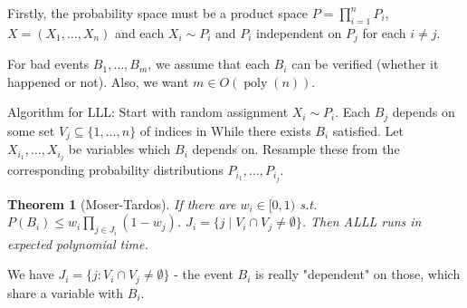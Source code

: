 \documentclass{article}
\theoremstyle{plain}
\newtheorem{thm}{Theorem}[section]
\theoremstyle{definition}
\newcommand{\poly}{\operatorname{poly}}
\begin{document}
Firstly, the probability space must be a product space $P=\prod_{i=1}^n P_i$, $X=(X_1,\ldots, X_n)$ and each $X_i\sim P_i$ and $P_i$ independent on $P_j$ for each $i\neq j$.

For bad events $B_1,\ldots, B_m$, we assume that each $B_i$ can be verified (whether it happened or not). Also, we want $m\in O(\poly(n))$.


Algorithm for LLL: Start with random assignment $X_i\sim P_i$. Each $B_j$ depends on some set $V_j\subseteq \{1,\ldots,n\}$ of indices in While there exists $B_i$ satisfied. Let $X_{i_1},\ldots,X_{i_j}$ be variables which $B_i$ depends on. Resample these from the corresponding probability distributions $P_{i_1},\ldots,P_{i_j}$.

\begin{thm}[Moser-Tardos]
	If there are $w_i\in[0,1)$ s.t. $P(B_i)\leq w_i\prod_{j\in J_i}(1-w_j)$. $J_i=\{j \mid V_i\cap V_j\neq \emptyset\}$. Then ALLL runs in expected polynomial time.
\end{thm}

We have $J_i=\{j: V_i\cap V_j\neq\emptyset\}$ - the event $B_i$ is really "dependent" on those, which share a variable with $B_i$.
\end{document}
